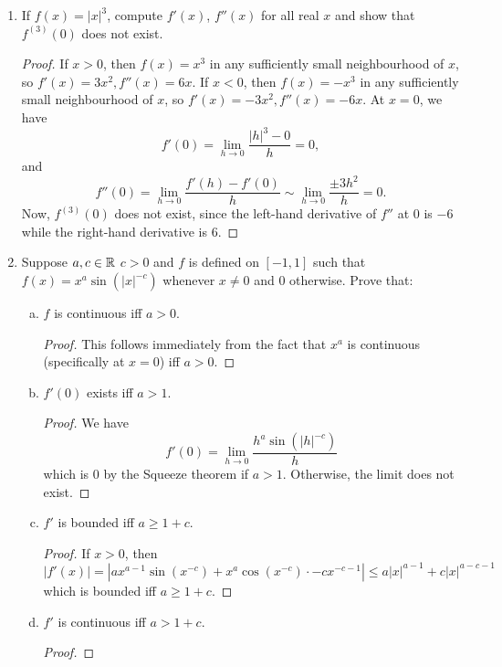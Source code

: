 \begin{enumerate}[1.]
\item %
    If $f(x) = |x|^3$, compute $f'(x)$, $f''(x)$ for all real $x$ and show that $f^{(3)}(0)$ does not exist.
    
    \begin{proof}
        If $x > 0$, then $f(x) = x^3$ in any sufficiently small neighbourhood of $x$, so $f'(x) = 3x^2, f''(x) = 6x$. If $x < 0$, then $f(x) = -x^3$ in any sufficiently small neighbourhood of $x$, so $f'(x) = -3x^2, f''(x) = -6x$. At $x = 0$, we have
        \[
            f'(0) = \lim_{h \to 0} \frac{|h|^3 - 0}{h} = 0,
        \]
        and
        \[
            f''(0) = \lim_{h \to 0} \frac{f'(h) - f'(0)}{h} \sim \lim_{h \to 0} \frac{\pm3 h^2}{h} = 0.
        \]
        Now, $f^{(3)}(0)$ does not exist, since the left-hand derivative of $f''$ at 0 is $-6$ while the right-hand derivative is $6$.
    \end{proof}
\item %
    Suppose $a, c \in \mathbb{R}$ $c > 0$ and $f$ is defined on $[-1, 1]$ such that $f(x) = x^a \sin(|x|^{-c})$ whenever $x \ne 0$ and $0$ otherwise.
    Prove that:
    \begin{enumerate}[(a)]
        \item $f$ is continuous iff $a > 0$.
            \begin{proof}
                This follows immediately from the fact that $x^a$ is continuous (specifically at $x = 0$) iff $a > 0$.
            \end{proof}
        \item $f'(0)$ exists iff $a > 1$.
            \begin{proof}
                We have
                \[
                    f'(0) = \lim_{h \to 0} \frac{h^a \sin(|h|^{-c})}{h}
                \]
                which is $0$ by the Squeeze theorem if $a > 1$. Otherwise, the limit does not exist.
            \end{proof}
        \item $f'$ is bounded iff $a \ge 1 + c$.
            \begin{proof}
            If $x > 0$, then 
            \[
                |f'(x)| = |ax^{a - 1} \sin (x^{-c}) + x^a \cos(x^{-c}) \cdot -cx^{-c-1}| \le a |x|^{a-1} + c |x|^{a-c-1}
            \]
            which is bounded iff $a \ge 1 + c$.
            \end{proof}
        \item $f'$ is continuous iff $a > 1 + c$.
            \begin{proof}

\end{proof}
\end{enumerate}
\end{enumerate}
